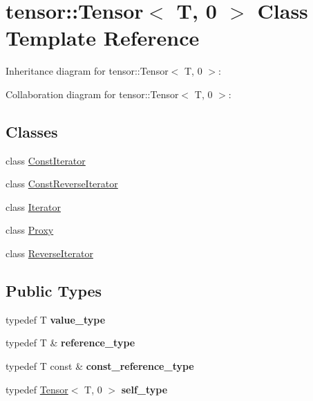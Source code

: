 \hypertarget{classtensor_1_1Tensor_3_01T_00_010_01_4}{}\section{tensor\+:\+:Tensor$<$ T, 0 $>$ Class Template Reference}
\label{classtensor_1_1Tensor_3_01T_00_010_01_4}


Inheritance diagram for tensor\+:\+:Tensor$<$ T, 0 $>$\+:


Collaboration diagram for tensor\+:\+:Tensor$<$ T, 0 $>$\+:
\subsection*{Classes}
\begin{DoxyCompactItemize}
\item 
class \hyperlink{classtensor_1_1Tensor_3_01T_00_010_01_4_1_1ConstIterator}{Const\+Iterator}
\item 
class \hyperlink{classtensor_1_1Tensor_3_01T_00_010_01_4_1_1ConstReverseIterator}{Const\+Reverse\+Iterator}
\item 
class \hyperlink{classtensor_1_1Tensor_3_01T_00_010_01_4_1_1Iterator}{Iterator}
\item 
class \hyperlink{classtensor_1_1Tensor_3_01T_00_010_01_4_1_1Proxy}{Proxy}
\item 
class \hyperlink{classtensor_1_1Tensor_3_01T_00_010_01_4_1_1ReverseIterator}{Reverse\+Iterator}
\end{DoxyCompactItemize}
\subsection*{Public Types}
\begin{DoxyCompactItemize}
\item 
typedef T {\bfseries value\+\_\+type}\hypertarget{classtensor_1_1Tensor_3_01T_00_010_01_4_ab5e40f40230fc1fa82164c3e546b03a5}{}\label{classtensor_1_1Tensor_3_01T_00_010_01_4_ab5e40f40230fc1fa82164c3e546b03a5}

\item 
typedef T \& {\bfseries reference\+\_\+type}\hypertarget{classtensor_1_1Tensor_3_01T_00_010_01_4_abd7e53883d2748bd4bf091349f3f4eae}{}\label{classtensor_1_1Tensor_3_01T_00_010_01_4_abd7e53883d2748bd4bf091349f3f4eae}

\item 
typedef T const \& {\bfseries const\+\_\+reference\+\_\+type}\hypertarget{classtensor_1_1Tensor_3_01T_00_010_01_4_a1863269738b7de76a5bac207a1f0f8ee}{}\label{classtensor_1_1Tensor_3_01T_00_010_01_4_a1863269738b7de76a5bac207a1f0f8ee}

\item 
typedef \hyperlink{classtensor_1_1Tensor}{Tensor}$<$ T, 0 $>$ {\bfseries self\+\_\+type}\hypertarget{classtensor_1_1Tensor_3_01T_00_010_01_4_acc9f383bab274588a17433616e4cf300}{}\label{classtensor_1_1Tensor_3_01T_00_010_01_4_acc9f383bab274588a17433616e4cf300}

\end{DoxyCompactItemize}
